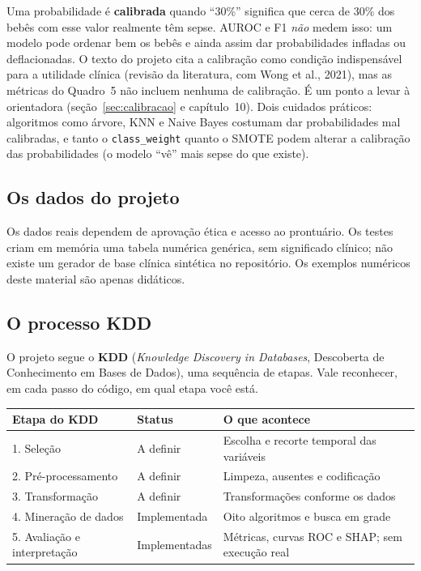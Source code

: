 \documentclass[11pt,a4paper]{article}
\newcommand{\cod}[1]{\texttt{#1}}
\begin{document}
\begin{atencao}
Uma probabilidade é \textbf{calibrada} quando ``30\%'' significa que cerca de 30\% dos bebês com esse valor realmente têm sepse.
AUROC e F1 \emph{não} medem isso: um modelo pode ordenar bem os bebês e ainda assim dar probabilidades infladas ou deflacionadas.
O texto do projeto cita a calibração como condição indispensável para a utilidade clínica (revisão da literatura, com Wong et al., 2021),
mas as métricas do Quadro~5 não incluem nenhuma de calibração. É um ponto a levar à orientadora (seção~\ref{sec:calibracao} e capítulo~10).
Dois cuidados práticos: algoritmos como árvore, KNN e Naive Bayes costumam dar probabilidades mal calibradas, e tanto o
\cod{class\_weight} quanto o SMOTE podem alterar a calibração das probabilidades (o modelo ``vê'' mais sepse do que existe).
\end{atencao}

\subsection{Os dados do projeto}

Os dados reais dependem de aprovação ética e acesso ao prontuário. Os testes criam em memória uma tabela numérica genérica, sem significado clínico; não existe um gerador de base clínica sintética no repositório. Os exemplos numéricos deste material são apenas didáticos.

\subsection{O processo KDD}

O projeto segue o \textbf{KDD} (\emph{Knowledge Discovery in Databases}, Descoberta de Conhecimento em Bases de Dados),
uma sequência de etapas. Vale reconhecer, em cada passo do código, em qual etapa você está.

\begin{center}
\begin{tabular}{@{}llp{5.6cm}@{}}
\toprule
\textbf{Etapa do KDD} & \textbf{Status} & \textbf{O que acontece} \\
\midrule
1. Seleção & A definir & Escolha e recorte temporal das variáveis \\
2. Pré-processamento & A definir & Limpeza, ausentes e codificação \\
3. Transformação & A definir & Transformações conforme os dados \\
4. Mineração de dados & Implementada & Oito algoritmos e busca em grade \\
5. Avaliação e interpretação & Implementadas & Métricas, curvas ROC e SHAP; sem execução real \\


\bottomrule
\end{tabular}
\end{center}
\end{document}
